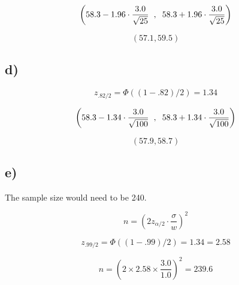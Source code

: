 \documentclass[a4paper,11pt]{article}
\begin{document}
\[ \left(58.3- 1.96 \cdot \frac{3.0}{\sqrt{25}} \hspace{2mm}, \hspace{2mm} 58.3 + 1.96 \cdot \frac{3.0}{\sqrt{25}} \right)\]

\[ (57.1, 59.5) \]


\subsection*{d)}

\[ z_{.82/2} = \Phi((1 - .82)/2) = 1.34 \]

\[ \left(58.3- 1.34 \cdot \frac{3.0}{\sqrt{100}} \hspace{2mm}, \hspace{2mm} 58.3 + 1.34 \cdot \frac{3.0}{\sqrt{100}} \right)\]

\[ (57.9, 58.7) \]

\subsection*{e)}

The sample size would need to be 240.

\[n = \left(2 z_{\alpha/2} \cdot \frac{\sigma}{w}\right)^2\]

\[ z_{.99/2} = \Phi((1 - .99)/2) = 1.34 = 2.58 \]

\[n = \left(2 \times 2.58 \times \frac{3.0}{1.0} \right)^2 = 239.6 \]
\end{document}
